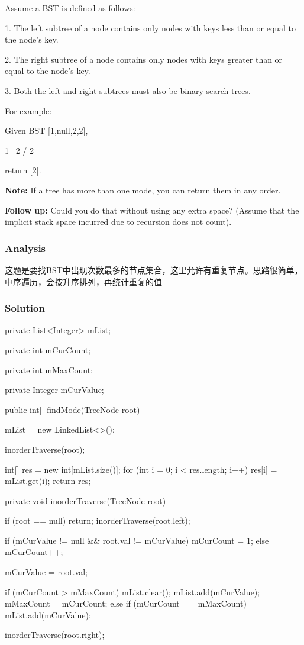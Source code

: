 Assume a BST is defined as follows:

1. The left subtree of a node contains only nodes with keys less than or equal to the node's key.

2. The right subtree of a node contains only nodes with keys greater than or equal to the node's key.

3. Both the left and right subtrees must also be binary search trees.

For example:

Given BST [1,null,2,2],
\begin{Code}
   1
    \
     2
    /
   2
\end{Code}

return [2].

\textbf{Note:} If a tree has more than one mode, you can return them in any order.

\textbf{Follow up:} Could you do that without using any extra space? (Assume that the implicit stack space incurred due to recursion does not count).

\subsubsection{Analysis}
这题是要找BST中出现次数最多的节点集合，这里允许有重复节点。思路很简单，中序遍历，会按升序排列，再统计重复的值


\newpage

\subsubsection{Solution}

\begin{Code}
private List<Integer> mList;

private int mCurCount;

private int mMaxCount;

private Integer mCurValue;

public int[] findMode(TreeNode root) {
    mList = new LinkedList<>();

    inorderTraverse(root);

    int[] res = new int[mList.size()];
    for (int i = 0; i < res.length; i++) {
        res[i] = mList.get(i);
    }
    return res;
}

private void inorderTraverse(TreeNode root) {
    if (root == null) {
        return;
    }
    inorderTraverse(root.left);


    if (mCurValue != null && root.val != mCurValue) {
        mCurCount = 1;
    } else {
        mCurCount++;
    }

    mCurValue = root.val;

    if (mCurCount > mMaxCount) {
        mList.clear();
        mList.add(mCurValue);
        mMaxCount = mCurCount;
    } else if (mCurCount == mMaxCount) {
        mList.add(mCurValue);
    }

    inorderTraverse(root.right);
}
\end{Code}

